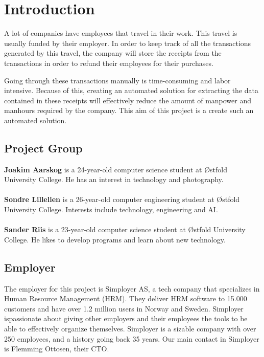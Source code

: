 \chapter{Introduction}
\label{ch:intro}
A lot of companies have employees that travel in their work.
This travel is usually funded by their employer.
In order to keep track of all the transactions generated by this travel, the company will store the receipts from the transactions in order to refund their employees for their purchases.

Going through these transactions manually is time-consuming and labor intensive.
Because of this, creating an automated solution for extracting the data contained in these receipts will effectively reduce the amount of manpower and manhours required by the company.
This aim of this project is a create such an automated solution.
\section{Project Group}\label{sec:project-group}
\textbf{Joakim Aarskog} is a 24-year-old computer science student at Østfold University College.
He has an interest in technology and photography.\\
\\
\textbf{Sondre Lillelien} is a 26-year-old computer engineering student at Østfold University College.
Interests include technology, engineering and AI.\\
\\
\textbf{Sander Riis} is a 23-year-old computer science student at Østfold University College.
He likes to develop programs and learn about new technology.
\section{Employer}\label{sec:employer}
The employer for this project is Simployer AS, a tech company that specializes in Human Resource Management (HRM).
They deliver HRM software to 15.000 customers and have over 1.2 million users in Norway and Sweden.
Simployer ispassionate about giving other employers and their employees the tools to be able to effectively organize themselves.
Simployer is a sizable company with over 250 employees, and a history going back 35 years.
Our main contact in Simployer is Flemming Ottosen, their CTO.
\section{}

